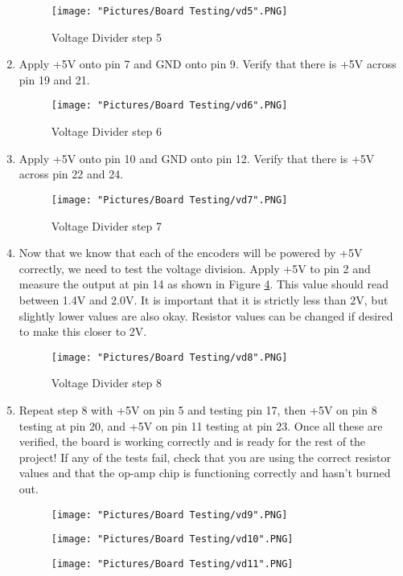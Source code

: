 \documentclass[12pt]{article}
\begin{document}
\begin{enumerate}
\begin{figure}[H]
		 	\centering
			\texttt{[image: "Pictures/Board Testing/vd5".PNG]}
		 	\caption{Voltage Divider step 5}
			\label{vd5}
		\end{figure}
	\item Apply +5V onto pin 7 and GND onto pin 9. Verify that there is +5V across pin 19 and 21.
		\begin{figure}[H]
		 	\centering
			\texttt{[image: "Pictures/Board Testing/vd6".PNG]}
		 	\caption{Voltage Divider step 6}
			\label{vd6}
		\end{figure}
	\item Apply +5V onto pin 10 and GND onto pin 12. Verify that there is +5V across pin 22 and 24.
		\begin{figure}[H]
		 	\centering
			\texttt{[image: "Pictures/Board Testing/vd7".PNG]}
		 	\caption{Voltage Divider step 7}
			\label{vd7}
		\end{figure}
	\item Now that we know that each of the encoders will be powered by +5V correctly, we need to test the voltage division. Apply +5V to pin 2 and measure the output at pin 14 as shown in Figure \ref{vd8}. This value should read between 1.4V and 2.0V. It is important that it is strictly less than 2V, but slightly lower values are also okay. Resistor values can be changed if desired to make this closer to 2V. 
		\begin{figure}[H]
		 	\centering
			\texttt{[image: "Pictures/Board Testing/vd8".PNG]}
		 	\caption{Voltage Divider step 8}
			\label{vd8}
		\end{figure}
	\item Repeat step 8 with +5V on pin 5 and testing pin 17, then +5V on pin 8 testing at pin 20, and +5V on pin 11 testing at pin 23. Once all these are verified, the board is working correctly and is ready for the rest of the project! If any of the tests fail, check that you are using the correct resistor values and that the op-amp chip is functioning correctly and hasn't burned out.  

	\begin{figure}[H]
	 	\centering
	  	\begin{minipage}[b]{0.45\textwidth}
			\texttt{[image: "Pictures/Board Testing/vd9".PNG]}
	  	\end{minipage}
	  	\hfill
	  	\begin{minipage}[b]{0.45\textwidth}
	    		\texttt{[image: "Pictures/Board Testing/vd10".PNG]}
	  	\end{minipage}
		\label{}
	\end{figure}


		\begin{figure}[H]
		 	\centering
			\texttt{[image: "Pictures/Board Testing/vd11".PNG]}
		 	\caption{}
			\label{vd11}
		\end{figure}

\end{enumerate}
\end{document}
